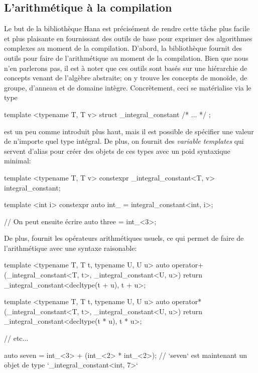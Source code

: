 \subsection{L'arithmétique à la compilation}
Le but de la bibliothèque Hana est précisément de rendre cette tâche plus
facile et plus plaisante en fournissant des outils de base pour exprimer des
algorithmes complexes au moment de la compilation. D'abord, la bibliothèque
fournit des outils pour faire de l'arithmétique au moment de la compilation.
Bien que nous n'en parlerons pas, il est à noter que ces outils sont basés
sur une hiérarchie de concepts venant de l'algèbre abstraite; on y trouve les
concepts de monoïde, de groupe, d'anneau et de domaine intègre. Concrètement,
ceci se matérialise via le type
\begin{cpp}
    template <typename T, T v>
    struct _integral_constant { /* ... */ };
\end{cpp}

 est un peu comme  introduit plus haut,
mais il est possible de spécifier une valeur de n'importe quel type intégral.
De plus, on fournit des \textit{variable templates} qui servent d'alias pour
créer des objets de ces types avec un poid syntaxique minimal:
\begin{cpp}
    template <typename T, T v>
    constexpr _integral_constant<T, v> integral_constant{};

    template <int i>
    constexpr auto int_ = integral_constant<int, i>;

    // On peut ensuite écrire
    auto three = int_<3>;
\end{cpp}

De plus,  fournit les opérateurs arithmétiques usuels,
ce qui permet de faire de l'arithmétique avec une syntaxe raisonable:
\begin{cpp}
    template <typename T, T t, typename U, U u>
    auto operator+(_integral_constant<T, t>, _integral_constant<U, u>)
    { return _integral_constant<decltype(t + u), t + u>{}; }

    template <typename T, T t, typename U, U u>
    auto operator*(_integral_constant<T, t>, _integral_constant<U, u>)
    { return _integral_constant<decltype(t * u), t * u>{}; }

    // etc...

    auto seven = int_<3> + (int_<2> * int_<2>);
    // `seven` est maintenant un objet de type `_integral_constant<int, 7>`
\end{cpp}

